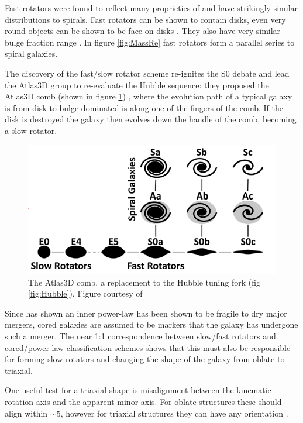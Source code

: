 	Fast rotators were found to reflect many proprieties of and have strikingly similar distributions to spirals. Fast rotators can be shown to contain disks, even very round objects can be shown to be face-on disks \citep{Cappellari2013a, Weijmans2014}. They also have very similar bulge fraction range \citep{Krajnovic2013}. In figure \ref{fig:MassRe} fast rotators form a parallel series to spiral galaxies.

	The discovery of the fast/slow rotator scheme re-ignites the S0 debate and lead the Atlas3D group to re-evaluate the Hubble sequence: they proposed the Atlas3D comb (shown in figure \ref{fig:Atlas3Dcomb}) \citep{Cappellari2011a}, where the evolution path of a typical galaxy is from disk to bulge dominated is along one of the fingers of the comb. If the disk is destroyed the galaxy then evolves down the handle of the comb, becoming a slow rotator. 

	\begin{figure}
		\centering
		\includegraphics[width=\textwidth]{introduction/Atlas3D_comb.png}
		\caption[The Atlas3D comb]{The Atlas3D comb, a replacement to the Hubble tuning fork (fig \ref{fig:Hubble}). Figure courtesy of \citet{Cappellari2011a}}
		\label{fig:Atlas3Dcomb}
	\end{figure}

	Since \citet{Sarzi2015} has shown an inner power-law has been shown to be fragile to dry major mergers, cored galaxies are assumed to be markers that the galaxy has undergone such a merger. The near 1:1 correspondence between slow/fast rotators and cored/power-law classification schemes shows that this must also be responsible for forming slow rotators and changing the shape of the galaxy from oblate to triaxial.

	One useful test for a triaxial shape is misalignment between the kinematic rotation axis and the apparent minor axis. For oblate structures these should align within $\sim 5$\textdegree, however for triaxial structures they can have any orientation \citep{Contopoulos1956, Stark1977, Statler1987}. 

